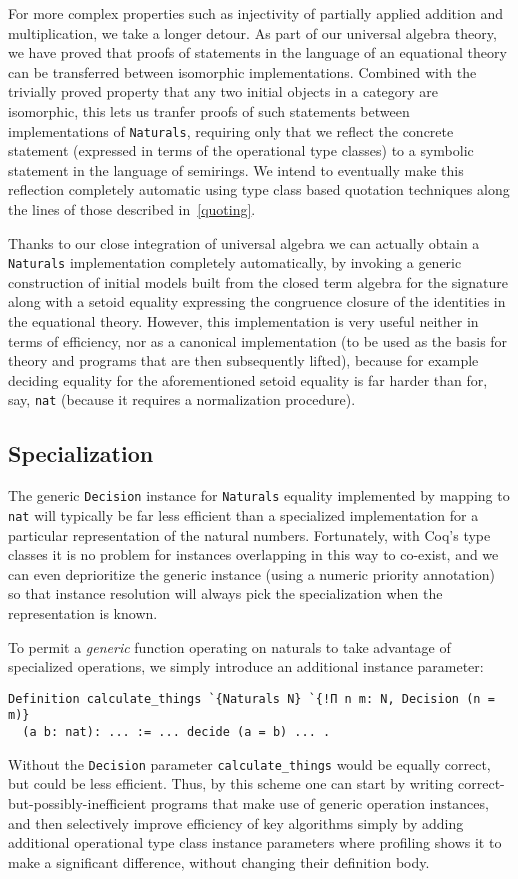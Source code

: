 \documentclass[a4paper,10pt,runningheads]{llncs}
\begin{document}
For more complex properties such as injectivity of partially applied addition and multiplication, we take a longer detour. As part of our universal algebra theory, we have proved that proofs of statements in the language of an equational theory can be transferred between isomorphic implementations. Combined with the trivially proved property that any two initial objects in a category are isomorphic, this lets us tranfer proofs of such statements between implementations of \lstinline|Naturals|, requiring only that we reflect the concrete statement (expressed in terms of the operational type classes) to a symbolic statement in the language of semirings. We intend to eventually make this reflection completely automatic using type class based quotation techniques along the lines of those described in~\ref{quoting}.

Thanks to our close integration of universal algebra we can actually obtain a \lstinline|Naturals| implementation completely automatically, by invoking a generic construction of initial models built from the closed term algebra for the signature along with a setoid equality expressing the congruence closure of the identities in the equational theory. However, this implementation is very useful neither in terms of efficiency, nor as a canonical implementation (to be used as the basis for theory and programs that are then subsequently lifted), because for example deciding equality for the aforementioned setoid equality is far harder than for, say, \lstinline|nat| (because it requires a normalization procedure).

\subsection{Specialization}

The generic \lstinline|Decision| instance for \lstinline|Naturals| equality implemented by mapping to \lstinline|nat| will typically be far less efficient than a specialized implementation for a particular representation of the natural numbers. Fortunately, with Coq's type classes it is no problem for instances overlapping in this way to co-exist, and we can even deprioritize the generic instance (using a numeric priority annotation) so that instance resolution will always pick the specialization when the representation is known.

To permit a \emph{generic} function operating on naturals to take advantage of specialized operations, we simply introduce an additional instance parameter:
\begin{lstlisting}
Definition calculate_things `{Naturals N} `{!Π n m: N, Decision (n = m)}
  (a b: nat): ... := ... decide (a = b) ... .
\end{lstlisting}
Without the \lstinline|Decision| parameter \lstinline|calculate_things| would be equally correct, but could be less efficient. Thus, by this scheme one can start by writing correct-but-possibly-inefficient programs that make use of generic operation instances, and then selectively improve efficiency of key algorithms simply by adding additional operational type class instance parameters where profiling shows it to make a significant difference, without changing their definition body.
\end{document}
